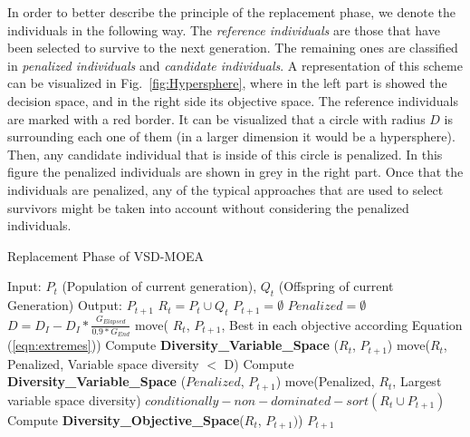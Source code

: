 In order to better describe the principle of the replacement phase, we denote the individuals in the following way.
%
The \textit{reference individuals} are those that have been selected to survive to the next generation. 
%
The remaining ones are classified in \textit{penalized individuals} and \textit{candidate individuals}.
%
A representation of this scheme can be visualized in Fig.~\ref{fig:Hypersphere}, where in the left part is showed the decision space, and in the right side its objective space.
%
The reference individuals are marked with a red border.
%
It can be visualized that a circle with radius $D$ is surrounding each one of them (in a larger dimension it would be a hypersphere).
%
Then, any candidate individual that is inside of this circle is penalized.
%
In this figure the penalized individuals are shown in grey in the right part.
%
Once that the individuals are penalized, any of the typical approaches that are used to select survivors might be taken into account without considering the penalized individuals.


\begin{algorithm}[t]
  \scriptsize
	\caption{Replacement Phase of VSD-MOEA} 
\begin{algorithmic}[1]
\STATE Input: $P_t$ (Population of current generation), $Q_t$ (Offspring of current Generation)
    	\STATE Output: $P_{t+1}$ 
        \STATE $R_t = P_t \cup Q_t$ \label{alg:1}
        \STATE $P_{t+1} = \emptyset$ \label{alg:2}
        \STATE $Penalized = \emptyset$ \label{alg:3}
				\STATE $D = D_I - D_I * \frac{G_{Elapsed}}{0.9*G_{End}}$ \label{alg:4}
		\STATE move( $R_t$,  $P_{t+1}$, Best in each objective according Equation (\ref{eqn:extremes})) \label{alg:5}
         \label{alg:6}
			\STATE Compute \textbf{Diversity\_Variable\_Space} ($R_t$, $P_{t+1}$) \label{alg:7}
		\STATE move($R_t$, Penalized, Variable space diversity $ < $ D)  \label{alg:8}
         \label{alg:9}
				\STATE Compute \textbf{Diversity\_Variable\_Space} ($Penalized$, $P_{t+1}$) \label{alg:10}
				\STATE move(Penalized, $R_t$, Largest variable space diversity) \label{alg:11}
        \ENDIF
		\STATE $conditionally-non-dominated-sort(R_t \cup P_{t+1}) $ \label{alg:12}
		\STATE Compute \textbf{Diversity\_Objective\_Space}($R_t$, $P_{t+1})$) \label{alg:13}
        \ENDWHILE
    	\RETURN $P_{t+1}$ \label{alg:14}
	\end{algorithmic}
\label{alg:Replacement_Phase}
\end{algorithm}


